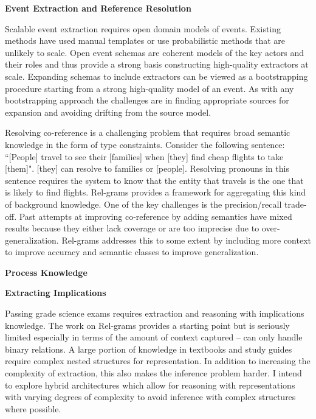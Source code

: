 \documentclass[a4paper,11pt,onecolumn]{article}
\begin{document}
{\bf Event Extraction and Reference Resolution}

Scalable event extraction requires open domain models of events. Existing methods have used manual templates or use probabilistic methods that are unlikely to scale.%
Open event schemas are coherent models of the key actors and their roles and thus provide a strong basis constructing high-quality extractors at scale. Expanding schemas to include extractors can be viewed as a bootstrapping procedure starting from a strong high-quality model of an event. As with any bootstrapping approach the challenges are in finding appropriate sources for expansion and avoiding drifting from the source model. 

Resolving co-reference is a challenging problem that requires broad semantic knowledge in the form of type constraints. Consider the following sentence: ``[People] travel to see their [families] when [they] find cheap flights to take [them]". [they] can resolve to families or [people]. Resolving pronouns in this sentence requires the system to know that the entity that travels is the one that is likely to find flights. Rel-grams provides a framework for aggregating this kind of background knowledge. One of the key challenges is the precision/recall trade-off. Past attempts at improving co-reference by adding semantics have mixed results because they either lack coverage or are too imprecise due to over-generalization. Rel-grams addresses this to some extent by including more context to improve accuracy and semantic classes to improve generalization.

{\bf Process Knowledge}

{\bf Extracting Implications}

Passing grade science exams requires extraction and reasoning with implications knowledge. The work on Rel-grams provides a starting point but is seriously limited especially in terms of the amount of context captured -- can only handle binary relations. A large portion of knowledge in textbooks and study guides require complex nested structures for representation. In addition to increasing the complexity of extraction, this also makes the inference problem harder. I intend to explore hybrid architectures which allow for reasoning with representations with varying degrees of complexity to avoid inference with complex structures where possible. 
\end{document}
